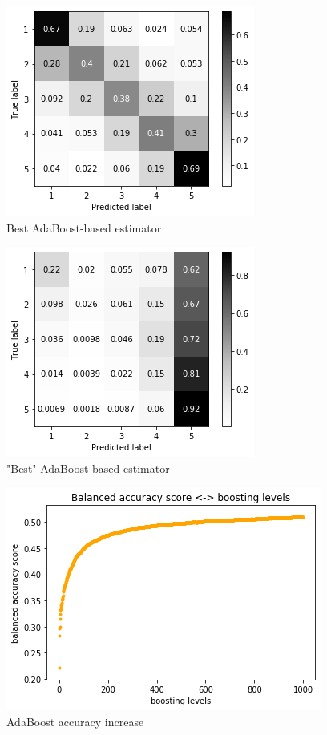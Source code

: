\documentclass[letterpaper]{article}
\begin{document}
\begin{figure}[h]
    \centering
    \includegraphics[scale=0.65]{adaboost-absolute-best.png}
    \caption{Best AdaBoost-based estimator}
\end{figure}

\begin{figure}[h]
    \centering
    \includegraphics[scale=0.65]{adaboost-best-simple.png}
    \caption{"Best" AdaBoost-based estimator}
\end{figure}

\begin{figure}[h]
    \centering
    \includegraphics[scale=0.8]{adaboost-increase.png}
    \caption{AdaBoost accuracy increase}
\end{figure}
\end{document}
